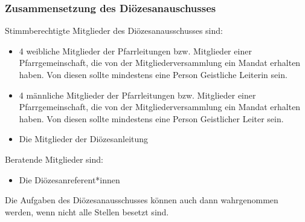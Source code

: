 \documentclass[12pt]{report}
\begin{document}
\begin{flushleft}
\subsubsection{Zusammensetzung des Diözesanauschusses}
Stimmberechtigte Mitglieder des Diözesanausschusses sind:
\begin{itemize}
  \item 4 weibliche Mitglieder der Pfarrleitungen bzw. Mitglieder einer Pfarrgemeinschaft, die von der
        Mitgliederversammlung ein Mandat erhalten haben. Von diesen sollte mindestens eine Person
        Geistliche Leiterin sein.
  \item 4 männliche Mitglieder der Pfarrleitungen bzw. Mitglieder einer Pfarrgemeinschaft, die von
        der Mitgliederversammlung ein Mandat erhalten haben. Von diesen sollte mindestens eine
        Person Geistlicher Leiter sein.
  \item Die Mitglieder der Diözesanleitung
\end{itemize}

Beratende Mitglieder sind:
\begin{itemize}
  \item Die Diözesanreferent*innen
\end{itemize}

Die Aufgaben des Diözesanausschusses können auch dann wahrgenommen werden, wenn nicht
alle Stellen besetzt sind.


\end{flushleft}
\end{document}
